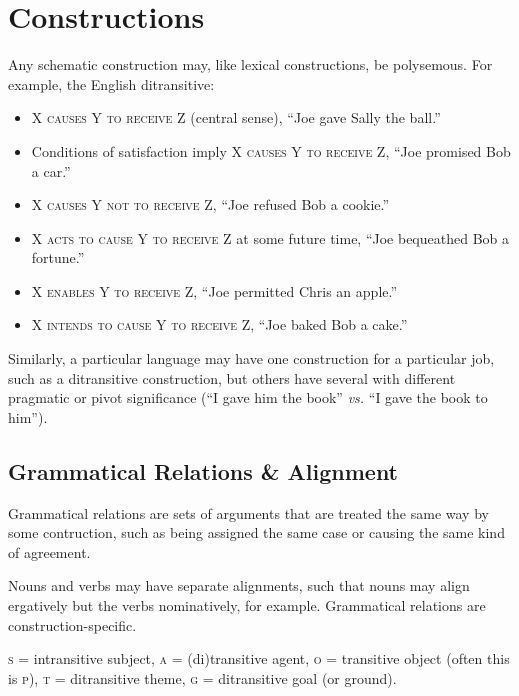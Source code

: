 \documentclass[11pt]{article}
\newcommand{\I}[1]{\textsc{#1}}   %
\newenvironment{grammarlist}%
 {\begin{itemize}\addtolength{\itemsep}{-0.5\baselineskip}\ignorespaces}%
 {\end{itemize}\ignorespacesafterend}
\begin{document}
{%

\section{Constructions}
Any schematic construction may, like lexical constructions, be
polysemous.  For example, the English ditransitive:

\begin{grammarlist}
  \item \I{X causes Y to receive Z} (central sense), ``Joe gave Sally
    the ball.''
  \item Conditions of satisfaction imply \I{X causes Y to receive Z},
    ``Joe promised Bob a car.''
  \item \I{X causes Y not to receive Z}, ``Joe refused Bob a cookie.''
  \item \I{X acts to cause Y to receive Z} at some future time, ``Joe
    bequeathed Bob a fortune.''
  \item \I{X enables Y to receive Z}, ``Joe permitted Chris an
    apple.''
  \item \I{X intends to cause Y to receive Z}, ``Joe baked Bob a cake.''
\end{grammarlist}

Similarly, a particular language may have one construction for a
particular job, such as a ditransitive construction, but others have
several with different pragmatic or pivot significance (``I gave him
the book'' \textit{vs.} ``I gave the book to him'').


\subsection{Grammatical Relations \& Alignment}
Grammatical relations are sets of arguments that are treated the same
way by some contruction, such as being assigned the same case or
causing the same kind of agreement.

Nouns and verbs may have separate alignments, such that nouns may
align ergatively but the verbs nominatively, for example.  Grammatical
relations are construction-specific.

\I{s} = intransitive subject, \I{a} = (di)transitive agent, \I{o} =
transitive object (often this is \I{p}), \I{t} = ditransitive theme,
\I{g} = ditransitive goal (or ground).

}
\end{document}
